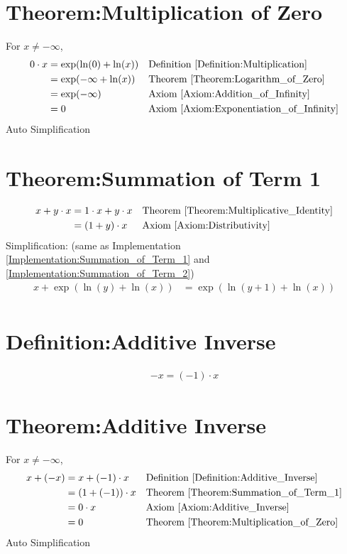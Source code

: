 \documentclass[12pt,a4paper]{report}
\begin{document}
\section{Theorem:Multiplication of Zero}
\label{Theorem:Multiplication_of_Zero}
For $x \neq -\infty$,
\begin{align*}
0 \cdot x
&= \exp(\ln(0) + \ln(x))
&& \text{Definition \ref{Definition:Multiplication}} \\
&= \exp(-\infty + \ln(x))
&& \text{Theorem \ref{Theorem:Logarithm_of_Zero}} \\
&= \exp(-\infty)
&& \text{Axiom \ref{Axiom:Addition_of_Infinity}} \\
&= 0
&& \text{Axiom \ref{Axiom:Exponentiation_of_Infinity}} \\
\end{align*}
Auto Simplification

\section{Theorem:Summation of Term 1}
\label{Theorem:Summation_of_Term_1}
\begin{align*}
x + y \cdot x
&= 1 \cdot x + y \cdot x
&& \text{Theorem \ref{Theorem:Multiplicative_Identity}} \\
&= (1+y) \cdot x
&& \text{Axiom \ref{Axiom:Distributivity}} \\
\end{align*}
Simplification: (same as Implementation \ref{Implementation:Summation_of_Term_1} and \ref{Implementation:Summation_of_Term_2})
\begin{align*}
x + \exp(\ln(y) + \ln(x)) &= \exp(\ln(y+1) + \ln(x)) \\
\end{align*}

\section{Definition:Additive Inverse}
\label{Definition:Additive_Inverse}
\begin{align*}
-x = (-1) \cdot x
\end{align*}

\section{Theorem:Additive Inverse}
\label{Theorem:Additive_Inverse}
For $x \neq -\infty$,
\begin{align*}
x + (-x)
&= x + (-1) \cdot x
&& \text{Definition \ref{Definition:Additive_Inverse}} \\
&= (1 + (-1)) \cdot x
&& \text{Theorem \ref{Theorem:Summation_of_Term_1}} \\
&= 0 \cdot x
&& \text{Axiom \ref{Axiom:Additive_Inverse}} \\
&= 0
&& \text{Theorem \ref{Theorem:Multiplication_of_Zero}} \\
\end{align*}
Auto Simplification
\end{document}
